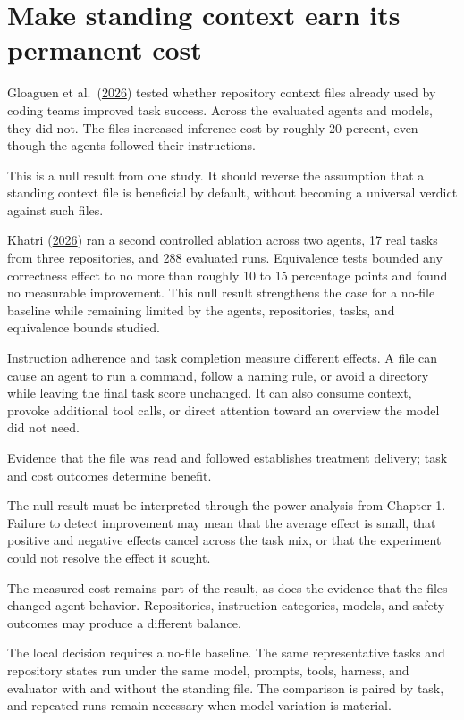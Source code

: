 \hypertarget{make-standing-context-earn-its-permanent-cost}{%
\section{Make standing context earn its permanent cost}\label{make-standing-context-earn-its-permanent-cost}}

Gloaguen et al.~(\href{https://arxiv.org/abs/2602.11988}{2026}) tested whether repository context files already used by coding teams improved task success. Across the evaluated agents and models, they did not. The files increased inference cost by roughly 20 percent, even though the agents followed their instructions.

This is a null result from one study. It should reverse the assumption that a standing context file is beneficial by default, without becoming a universal verdict against such files.

Khatri (\href{https://arxiv.org/abs/2607.27250}{2026}) ran a second controlled ablation across two agents, 17 real tasks from three repositories, and 288 evaluated runs. Equivalence tests bounded any correctness effect to no more than roughly 10 to 15 percentage points and found no measurable improvement. This null result strengthens the case for a no-file baseline while remaining limited by the agents, repositories, tasks, and equivalence bounds studied.

Instruction adherence and task completion measure different effects. A file can cause an agent to run a command, follow a naming rule, or avoid a directory while leaving the final task score unchanged. It can also consume context, provoke additional tool calls, or direct attention toward an overview the model did not need.

Evidence that the file was read and followed establishes treatment delivery; task and cost outcomes determine benefit.

The null result must be interpreted through the power analysis from Chapter 1. Failure to detect improvement may mean that the average effect is small, that positive and negative effects cancel across the task mix, or that the experiment could not resolve the effect it sought.

The measured cost remains part of the result, as does the evidence that the files changed agent behavior. Repositories, instruction categories, models, and safety outcomes may produce a different balance.

The local decision requires a no-file baseline. The same representative tasks and repository states run under the same model, prompts, tools, harness, and evaluator with and without the standing file. The comparison is paired by task, and repeated runs remain necessary when model variation is material.

